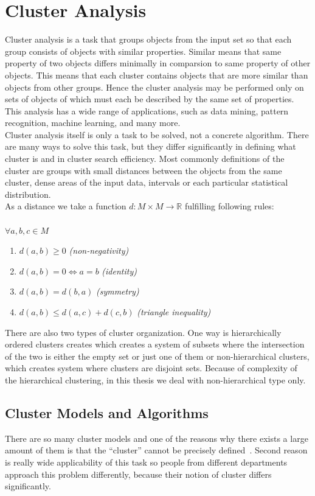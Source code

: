 \chapter{Cluster Analysis} \label{sec:clusteranalysis}
Cluster analysis is a task that groups objects from the input set so that each group consists of objects with similar properties. Similar means that same property of two objects differs minimally in comparsion to same property of other objects. This means that each cluster contains objects that are more similar than objects from other groups. Hence the cluster analysis may be performed only on sets of objects of which must each be described by the same set of properties. This analysis has a wide range of applications, such as data mining, pattern recognition, machine learning, and many more.\\
Cluster analysis itself is only a task to be solved, not a concrete algorithm. There are many ways to solve this task, but they differ significantly in defining what cluster is and in cluster search efficiency. Most commonly definitions of the cluster are groups with small distances between the objects from the same cluster, dense areas of the input data, intervals or each particular statistical distribution.\\
As a distance we take a function $d:M\times M \to \mathbb{R}$ fulfilling following rules:\\ \\
$ \forall  a,b,c \in M$
\begin{enumerate}
\item $d(a,b)\geq 0$ \textit{(non-negativity)}
\item $d(a,b) = 0 \iff a = b$ \textit{(identity)}
\item $d(a,b) = d(b,a)$ \textit{(symmetry)}
\item$d(a,b) \leq d(a,c) + d(c,b)$ \textit{(triangle inequality)}
\end{enumerate}
There are also two types of cluster organization. One way is hierarchically ordered clusters creates which creates a system of subsets where the intersection of the two is either the empty set or just one of them or non-hierarchical clusters, which creates system where clusters are disjoint sets. Because of complexity of the hierarchical clustering, in this thesis we deal with non-hierarchical type only.

\section{Cluster Models and Algorithms} \label{sec:clustermodels}
There are so many cluster models and one of the reasons why there exists a large amount of them is that the ``cluster'' cannot be precisely defined~\cite{EstivillCastro02}. Second reason is really wide applicability of this task so people from different departments approach this problem differently, because their notion of cluster differs significantly. \\

